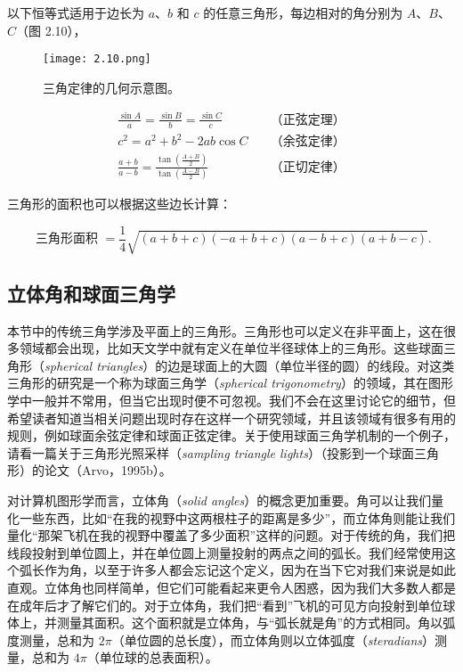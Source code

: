 \documentclass[lang=cn,12pt]{elegantbook}
\begin{document}
以下恒等式适用于边长为 $a$、$b$ 和 $c$ 的任意三角形，每边相对的角分别为 $A$、$B$、$C$（图 2.10），

\begin{figure}[htbp]
  \centering
  \texttt{[image: 2.10.png]}
  \caption{三角定律的几何示意图。}
\end{figure}

$$
  \begin{aligned}
    \frac{\sin A}{a}=\frac{\sin B}{b}=\frac{\sin C}{c}\quad                                      & \mbox{（正弦定理）} \\
    c^{2}=a^{2}+b^{2}-2 a b \cos C\quad                                                          & \mbox{（余弦定律）} \\
    \frac{a+b}{a-b}=\frac{\tan \left(\frac{A+B}{2}\right)}{\tan \left(\frac{A-B}{2}\right)}\quad & \mbox{（正切定律）}
  \end{aligned}
$$

三角形的面积也可以根据这些边长计算：

$$
  \text { 三角形面积 }=\frac{1}{4} \sqrt{(a+b+c)(-a+b+c)(a-b+c)(a+b-c)} .
$$

\subsection{立体角和球面三角学}

本节中的传统三角学涉及平面上的三角形。三角形也可以定义在非平面上，这在很多领域都会出现，比如天文学中就有定义在单位半径球体上的三角形。这些球面三角形（\textit{spherical triangles}）的边是球面上的大圆（单位半径的圆）的线段。对这类三角形的研究是一个称为球面三角学（\textit{spherical trigonometry}）的领域，其在图形学中一般并不常用，但当它出现时便不可忽视。我们不会在这里讨论它的细节，但希望读者知道当相关问题出现时存在这样一个研究领域，并且该领域有很多有用的规则，例如球面余弦定律和球面正弦定律。关于使用球面三角学机制的一个例子，请看一篇关于三角形光照采样（\textit{sampling triangle lights}）（投影到一个球面三角形）的论文（Arvo，1995b）。

对计算机图形学而言，立体角（\textit{solid angles}）的概念更加重要。角可以让我们量化一些东西，比如“在我的视野中这两根柱子的距离是多少”，而立体角则能让我们量化“那架飞机在我的视野中覆盖了多少面积”这样的问题。对于传统的角，我们把线段投射到单位圆上，并在单位圆上测量投射的两点之间的弧长。我们经常使用这个弧长作为角，以至于许多人都会忘记这个定义，因为在当下它对我们来说是如此直观。立体角也同样简单，但它们可能看起来更令人困惑，因为我们大多数人都是在成年后才了解它们的。对于立体角，我们把“看到”飞机的可见方向投射到单位球体上，并测量其面积。这个面积就是立体角，与“弧长就是角”的方式相同。角以弧度测量，总和为 $2\pi$（单位圆的总长度），而立体角则以立体弧度（\textit{steradians}）测量，总和为 $4\pi$（单位球的总表面积）。
\end{document}
